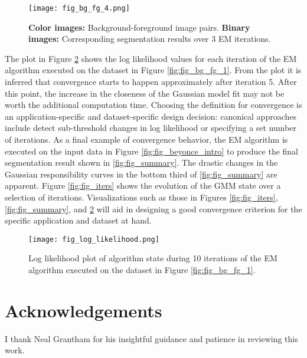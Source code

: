 \documentclass[conference]{IEEEtran}
\begin{document}
\begin{figure}[ht]
\centering
\texttt{[image: fig\_bg\_fg\_4.png]}
\caption{\textbf{Color images:} Background-foreground image pairs. \textbf{Binary images:} Corresponding segmentation results over 3 EM iterations.}
\label{fig:fig_bg_fg_4}
\vfill
\end{figure}

The plot in Figure \ref{fig:fig_log_likelihood} shows the log likelihood values for each iteration of the EM algorithm executed on the dataset in Figure \ref{fig:fig_bg_fg_1}. From the plot it is inferred that convergence starts to happen approximately after iteration 5. After this point, the increase in the closeness of the Gaussian model fit may not be worth the additional computation time. Choosing the definition for convergence is an application-specific and dataset-specific design decision: canonical approaches include detect sub-threshold changes in log likelihood or specifying a set number of iterations. As a final example of convergence behavior, the EM algorithm is executed on the input data in Figure \ref{fig:fig_beyonce_intro} to produce the final segmentation result shown in \ref{fig:fig_summary}. The drastic changes in the Gaussian responsibility curves in the bottom third of \ref{fig:fig_summary} are apparent. Figure \ref{fig:fig_iters} shows the evolution of the GMM state over a selection of iterations. Visualizations such as those in Figures \ref{fig:fig_iters}, \ref{fig:fig_summary}, and \ref{fig:fig_log_likelihood} will aid in designing a good convergence criterion for the specific application and dataset at hand.  

\begin{figure}[ht]
\centering
\texttt{[image: fig\_log\_likelihood.png]}
\caption{Log likelihood plot of algorithm state during 10 iterations of the EM algorithm executed on the dataset in Figure \ref{fig:fig_bg_fg_1}.}
\label{fig:fig_log_likelihood}
\vfill
\end{figure}

\section{Acknowledgements}
I thank Neal Grantham for his insightful guidance and patience in reviewing this work.
\end{document}
